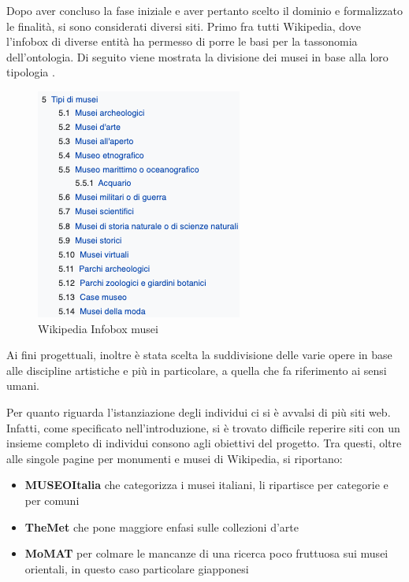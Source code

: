 \documentclass[12pt]{article}
\begin{document}
Dopo aver concluso la fase iniziale e aver pertanto scelto il dominio e formalizzato le finalità, si sono considerati diversi siti. Primo fra tutti Wikipedia, dove l’infobox di diverse entità ha permesso di porre le basi per la tassonomia dell’ontologia.
Di seguito viene mostrata la divisione dei musei in base alla loro tipologia \parencite{infomusei}.

\begin{figure}[!hb]
   \centering
   \includegraphics[scale=0.7]{fig/tassonomia musei wikipedia.png}
   \caption{Wikipedia Infobox musei}\label{fig:picture}
\end{figure}

Ai fini progettuali, inoltre è stata scelta la suddivisione delle varie opere in base alle discipline artistiche e più in particolare, a quella che fa riferimento ai sensi umani. \parencite{infopere}

Per quanto riguarda l’istanziazione degli individui ci si è avvalsi di più siti web. Infatti, come specificato nell’introduzione, si è trovato difficile reperire siti con un insieme completo di individui consono agli obiettivi del progetto.
Tra questi, oltre alle singole pagine per monumenti e musei di Wikipedia, si riportano: 
\begin{itemize}
 \item \textbf{MUSEOItalia} che categorizza i musei italiani, li ripartisce per categorie e per comuni \parencite{museoitalia}
 \item \textbf{TheMet} che pone maggiore enfasi sulle collezioni d’arte \parencite{themet}
 \item \textbf{MoMAT} per colmare le mancanze di una ricerca poco fruttuosa sui musei orientali, in questo caso particolare giapponesi \parencite{momat}
\end{itemize} 
\end{document}
